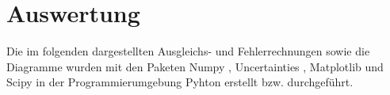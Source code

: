\section{Auswertung}
\label{sec:Auswertung}




Die im folgenden dargestellten Ausgleichs- und Fehlerrechnungen sowie die Diagramme wurden mit den Paketen Numpy \cite{numpy}, Uncertainties \cite{uncertainties}, Matplotlib \cite{matplotlib} und Scipy \cite{scipy} in der Programmierumgebung Pyhton erstellt bzw. durchgeführt.
